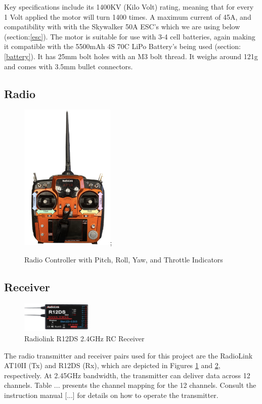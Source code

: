 \documentclass{article}
\begin{document}
Key specifications include its 1400KV (Kilo Volt) rating, meaning that for every 1 Volt applied the motor will turn 1400 times. A maximum current of 45A, and compatibility with with the Skywalker 50A ESC's which we are using below (section:\ref{esc}).
The motor is suitable for use with 3-4 cell batteries, again making it compatible with the 5500mAh 4S 70C LiPo Battery's being used (section:\ref{battery}). It has 25mm bolt holes with an M3 bolt thread. It weighs around 121g and comes with 3.5mm bullet connectors.

\subsection{Radio}
\begin{figure}[H]
  \centering
  \includegraphics[width=0.4\textwidth]{Pictures/radio.jpg};
  \caption{Radio Controller with Pitch, Roll, Yaw, and Throttle Indicators}
  \label{fig:radio_controller}
\end{figure}
\subsection{Receiver}
\begin{figure}[H]
  \centering
  \includegraphics[width=0.3\textwidth]{Pictures/reciever.png}
  \caption{Radiolink R12DS 2.4GHz RC Receiver}
  \label{fig:receiver}
\end{figure}
The radio transmitter and receiver pairs used for this project are the RadioLink AT10II (Tx) and R12DS (Rx), which are depicted in Figures \ref{fig:radio_controller} and \ref{fig:receiver}, respectively. At 2.45GHz bandwidth, the transmitter can deliver data across 12 channels. Table ... presents the 
channel mapping for the 12 channels. Consult the instruction manual [...] for details on how to operate the transmitter.
\end{document}
